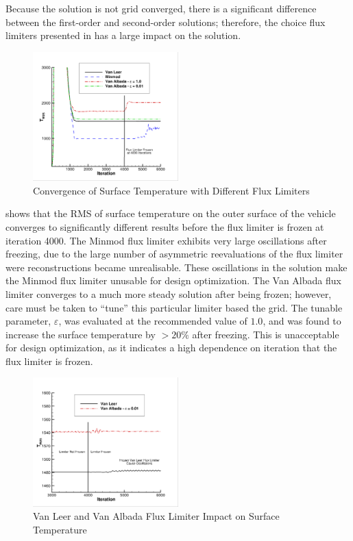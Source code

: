 Because the solution is not grid converged, there is a significant difference
between the first-order and second-order solutions; therefore, the choice flux
limiters presented in  has a large impact on
the solution.  
\begin{figure}[h]
  \centering
  \includegraphics[width=0.5\textwidth]{figures/limiters/all-limiters.png}
  \caption{Convergence of Surface Temperature with Different Flux Limiters}
  \label{fig:all-limiters}
\end{figure}
 shows that the RMS of surface temperature on the outer
surface of the vehicle converges to significantly different results before
the flux limiter is frozen at iteration 4000.  The Minmod flux limiter exhibits
very large oscillations after freezing, due to the large number of asymmetric
reevaluations of the flux limiter were reconstructions became unrealisable.
These oscillations in the solution make the Minmod flux limiter unusable for
design optimization. The Van Albada flux limiter converges to a much more steady
solution after being frozen; however, care must be taken to ``tune'' this
particular limiter based the grid.  The tunable parameter, $\varepsilon$, was
evaluated at the recommended value of $1.0$, and was found to increase the
surface temperature by $> 20\%$ after freezing.  This is unacceptable for design
optimization, as it indicates a high dependence on iteration that the flux
limiter is frozen.
\begin{figure}[h]
  \centering
  \includegraphics[width=0.5\textwidth]{figures/limiters/vanleer-vanalbada-frozen.png}
  \caption{Van Leer and Van Albada Flux Limiter Impact on Surface Temperature}
  \label{fig:vl-va-impact}
\end{figure}
